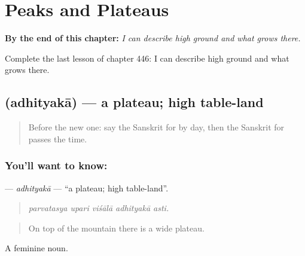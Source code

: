 
\chapter{Peaks and Plateaus}
\label{ch:sa-peaks-and-plateaus}

\begin{chapteropening}
\textbf{By the end of this chapter:} \emph{I can describe high ground and what grows there.}

Complete the last lesson of chapter 446: I can describe high ground and what grows there.
\end{chapteropening}

\section[\texorpdfstring{\sk{अधित्यका} (adhityakā)}{अधित्यका (adhityakā)}]{ (adhityakā) — a plateau; high table-land}

\label{lesson:SA-C446-adhityaka}



\begin{quote}
Before the new one: say the Sanskrit for by day, then the Sanskrit for passes the time.
\end{quote}

\subsection*{You'll want to know: }
\textbf{} — \emph{adhityakā} — \textquotedblleft{}a plateau; high table-land\textquotedblright{}.

\begin{quote}
    
\end{quote}

\begin{quote}
\emph{parvatasya upari viśālā adhityakā asti.}
\end{quote}

\begin{quote}
On top of the mountain there is a wide plateau.
\end{quote}

A feminine noun.

